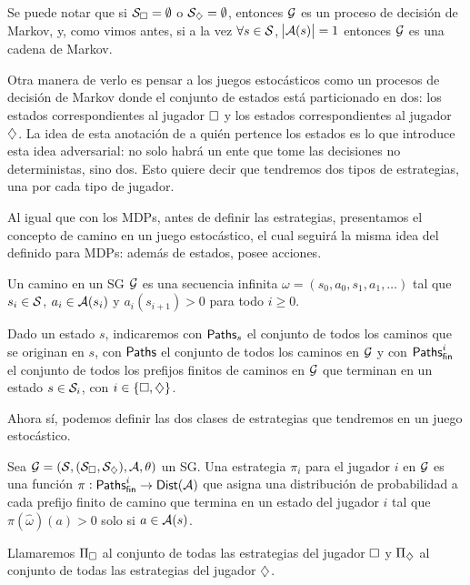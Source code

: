 Se puede notar que si $\mathcal{S}_\square = \emptyset$ o $\mathcal{S}_\diamondsuit = \emptyset$,
entonces $\mathcal{G}$ es un proceso de decisión de Markov, y, como vimos antes, si a la
vez $\forall s \in \mathcal{S}$, $\abs{\mathcal{A}(s)} = 1$ entonces $\mathcal{G}$ es una cadena de
Markov.

Otra manera de verlo es pensar a los juegos estocásticos como un procesos de
decisión de Markov donde el conjunto de estados está particionado en dos: los
estados correspondientes al jugador $\square$ y los estados correspondientes al
jugador $\diamondsuit$. La idea de esta anotación de a quién pertence los estados es
lo que introduce esta idea adversarial: no solo habrá un ente que tome las
decisiones no deterministas, sino dos. Esto quiere decir que tendremos dos
tipos de estrategias, una por cada tipo de jugador.

Al igual que con los MDPs, antes de definir las estrategias, presentamos el
concepto de camino en un juego estocástico, el cual seguirá la misma idea del
definido para MDPs: además de estados, posee acciones.

\begin{definition}[Camino en un SG]
	Un camino en un SG $\mathcal{G}$ es una secuencia infinita $\omega = (s_0, a_0, s_1, a_1, \dots)$ tal que $s_i \in \mathcal{S}$, $a_i \in \mathcal{A}(s_i)$ y $a_i(s_{i+1}) > 0$ para todo $i \geq 0$.

	Dado un estado $s$, indicaremos con $\textsf{Paths}_s$ el conjunto de todos los caminos
	que se originan en $s$, con $\textsf{Paths}$ el conjunto de todos los caminos en $\mathcal{G}$ y
	con $\textsf{Paths}_\textsf{fin}^i$ el conjunto de todos los prefijos finitos de caminos en $\mathcal{G}$
	que terminan en un estado $s \in \mathcal{S}_i$, con $i \in \{\square, \diamondsuit\}$.
\end{definition}

Ahora sí, podemos definir las dos clases de estrategias que tendremos en un
juego estocástico.

\begin{definition}
	Sea $\mathcal{G} = (\mathcal{S}, (\mathcal{S}_\square, \mathcal{S}_\diamondsuit), \mathcal{A}, \theta)$ un SG. Una estrategia $\pi_i$ para el jugador $i$ en $\mathcal{G}$ es una función $\pi: \textsf{Paths}_\textsf{fin}^i \rightarrow \mathsf{Dist} (\mathcal{A})$ que asigna una distribución de probabilidad a cada prefijo finito de camino que termina en un estado del jugador $i$ tal que $\pi(\hat \omega) (a) > 0$ solo si $a \in \mathcal{A}(s)$.

	Llamaremos $\Pi_\square$ al conjunto de todas las estrategias del jugador $\square$
	y $\Pi_\diamondsuit$ al conjunto de todas las estrategias del jugador $\diamondsuit$.
\end{definition}

